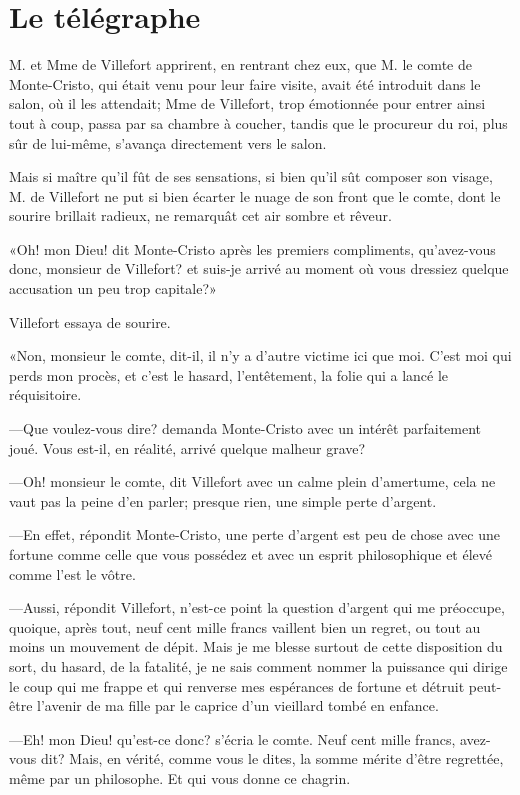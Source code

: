 \chapter{Le télégraphe} 

\lettrine{M}{.} et Mme de Villefort apprirent, en rentrant chez eux, que M. le comte de Monte-Cristo, qui était venu pour leur faire visite, avait été introduit dans le salon, où il les attendait; Mme de Villefort, trop émotionnée pour entrer ainsi tout à coup, passa par sa chambre à coucher, tandis que le procureur du roi, plus sûr de lui-même, s'avança directement vers le salon. 

Mais si maître qu'il fût de ses sensations, si bien qu'il sût composer son visage, M. de Villefort ne put si bien écarter le nuage de son front que le comte, dont le sourire brillait radieux, ne remarquât cet air sombre et rêveur.  

«Oh! mon Dieu! dit Monte-Cristo après les premiers compliments, qu'avez-vous donc, monsieur de Villefort? et suis-je arrivé au moment où vous dressiez quelque accusation un peu trop capitale?» 

Villefort essaya de sourire. 

«Non, monsieur le comte, dit-il, il n'y a d'autre victime ici que moi. C'est moi qui perds mon procès, et c'est le hasard, l'entêtement, la folie qui a lancé le réquisitoire. 

—Que voulez-vous dire? demanda Monte-Cristo avec un intérêt parfaitement joué. Vous est-il, en réalité, arrivé quelque malheur grave? 

—Oh! monsieur le comte, dit Villefort avec un calme plein d'amertume, cela ne vaut pas la peine d'en parler; presque rien, une simple perte d'argent. 

—En effet, répondit Monte-Cristo, une perte d'argent est peu de chose avec une fortune comme celle que vous possédez et avec un esprit philosophique et élevé comme l'est le vôtre. 

—Aussi, répondit Villefort, n'est-ce point la question d'argent qui me préoccupe, quoique, après tout, neuf cent mille francs vaillent bien un regret, ou tout au moins un mouvement de dépit. Mais je me blesse surtout de cette disposition du sort, du hasard, de la fatalité, je ne sais comment nommer la puissance qui dirige le coup qui me frappe et qui renverse mes espérances de fortune et détruit peut-être l'avenir de ma fille par le caprice d'un vieillard tombé en enfance. 

—Eh! mon Dieu! qu'est-ce donc? s'écria le comte. Neuf cent mille francs, avez-vous dit? Mais, en vérité, comme vous le dites, la somme mérite d'être regrettée, même par un philosophe. Et qui vous donne ce chagrin. 

